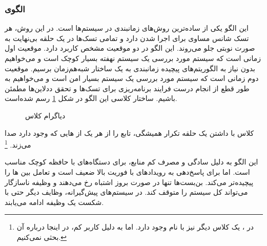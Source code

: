 \subsubsection{الگوی }
\label{scheduleCyclicExecSec}
\begin{RTL}
این الگو \cite{ref1} یکی از ساده‌ترین روش‌های زمانبندی
در سیستم‌ها است. در این روش،
هر تسک شانس مساوی برای اجرا شدن دارد و تمامی تسک‌ها در یک حلقه
بی‌نهایت به صورت نوبتی جلو می‌روند.
این الگو در دو موقعیت مشخص کاربرد دارد. موقعیت اول زمانی است که سیستم
مورد بررسی یک سیستم نهفته بسیار کوچک است و می‌خواهیم بدون نیاز به
الگوریتم‌های پیچیده زمانبندی به یک ساختار شبه‌هم‌زمان برسیم.
موقعیت دوم زمانی است که سیستم مورد بررسی یک سیستم بسیار امن است و
می‌خواهیم به طور قطع از انجام درست فرایند برنامه‌ریزی برای تسک‌ها و تحقق
ددلاین‌ها مطمئن باشیم.
ساختار کلاسی این الگو در شکل \ref{scheduleCyclicExecSecClassDiag}
رسم شده‌است.
\end{RTL}
\begin{figure}[h!]
\centering
{}
\caption{دیاگرام کلاس }
\label{scheduleCyclicExecSecClassDiag}
\end{figure}
\begin{RTL}
کلاس  با داشتن یک حلقه تکرار
همیشگی، تابع  را از هر یک از هایی
که وجود دارد صدا می‌زند. \footnote{در \cite{ref1}، یک کلاس دیگر نیز
با نام  وجود دارد. اما به دلیل کاربر کم، در اینجا درباره
آن بحثی نمی‌کنیم.}
\end{RTL}
\begin{RTL}
این الگو به دلیل سادگی و مصرف کم منابع، برای دستگاه‌های با حافظه کوچک
مناسب است. اما برای پاسخ‌دهی به رویدادهای با فوریت بالا ضعیف است
و تعامل بین ها را پیچیده‌تر می‌کند. بن‌بست‌ها تنها
در صورت بروز اشتباه رخ می‌دهند و وظیفه ناسازگار می‌تواند کل سیستم
را متوقف کند. در سیستم‌های پیش‌گیرانه، وظایف دیگر حتی با شکست
یک وظیفه ادامه می‌یابند.
\end{RTL}